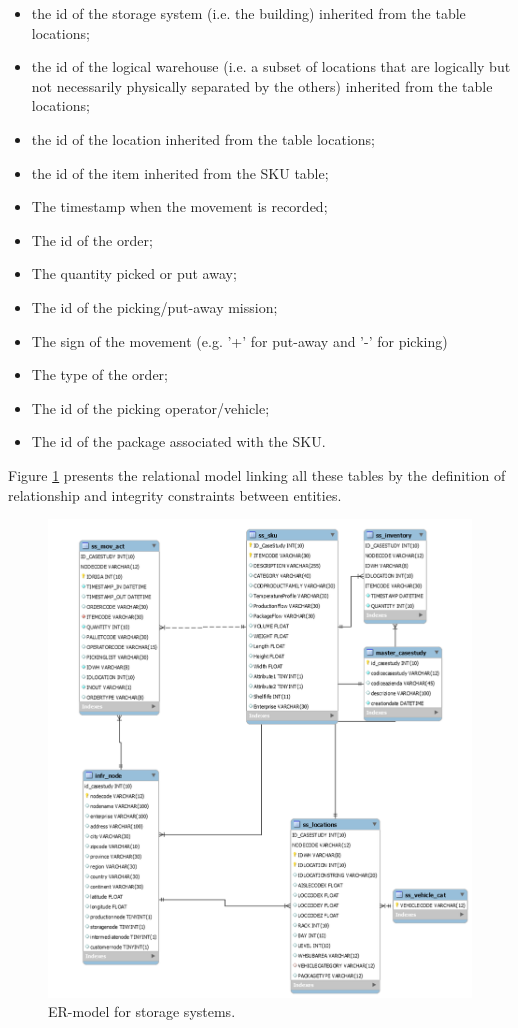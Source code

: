 \begin{itemize}
    \item the id of the storage system (i.e. the building) inherited from the table locations;
    \item the id of the logical warehouse (i.e. a subset of locations that are logically but not necessarily physically separated by the others) inherited from the table locations;
    \item the id of the location inherited from the table locations;
    \item the id of the item inherited from the SKU table;
    \item The timestamp when the movement is recorded;
    \item The id of the order;
    \item The quantity picked or put away;
    \item The id of the picking/put-away mission;
    \item The sign of the movement (e.g. '+' for put-away and '-' for picking)
    \item The type of the order;
    \item The id of the picking operator/vehicle;
    \item The id of the package associated with the SKU.

\end{itemize}

Figure \ref{fig_ER_wh} presents the relational model linking all these tables by the definition of relationship and integrity constraints between entities.

\begin{figure}[hbt!]
\centering
\includegraphics[width=1\textwidth]{SectionWarehouses/diagnsticModels_figures/fig_ER.png}
\captionsetup{type=figure}
\caption{ER-model for storage systems.}
\label{fig_ER_wh}
\end{figure}

